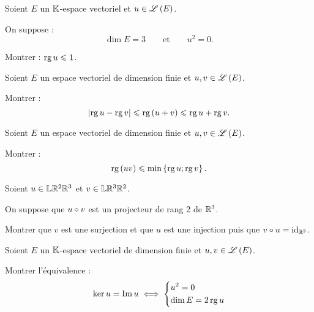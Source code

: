 \begin{corr}
\end{corr}

\begin{exo}
Soient \(E\) un \(\mathbb{K}\)-espace vectoriel et \(u\in\mathscr{L}\left(E\right)\).

On suppose : \[\dim E=3\qquad\text{et}\qquad u^2=0.\]

Montrer : \(\operatorname{rg} u\leqslant1\).
\end{exo}

\begin{corr}
\end{corr}

\begin{exo}
Soient \(E\) un espace vectoriel de dimension finie et \(u,v\in\mathscr{L}\left(E\right)\).

Montrer : \[\left\lvert\operatorname{rg} u-\operatorname{rg} v\right\rvert\leqslant\operatorname{rg}\left(u+v\right)\leqslant\operatorname{rg} u+\operatorname{rg} v.\]
\end{exo}

\begin{corr}
\end{corr}

\begin{exo}
Soient \(E\) un espace vectoriel de dimension finie et \(u,v\in\mathscr{L}\left(E\right)\).

Montrer : \[\operatorname{rg}\left(uv\right)\leqslant\min\left\lbrace\operatorname{rg} u;\operatorname{rg} v\right\rbrace.\]
\end{exo}

\begin{corr}
\end{corr}

\begin{exo}
Soient \(u\in\mathbb{L}{\mathbb{R}^2}{\mathbb{R}^3}\) et \(v\in\mathbb{L}{\mathbb{R}^3}{\mathbb{R}^2}\).

On suppose que \(u\circ v\) est un projecteur de rang 2 de \(\mathbb{R}^3\).

Montrer que \(v\) est une surjection et que \(u\) est une injection puis que \(v\circ u=\mathrm{id}_{\mathbb{R}^2}\).
\end{exo}

\begin{corr}
\end{corr}

\begin{exo}
Soient \(E\) un \(\mathbb{K}\)-espace vectoriel de dimension finie et \(u,v\in\mathscr{L}\left(E\right)\).

Montrer l'équivalence : \[\ker u=\operatorname{Im} u\iff\begin{dcases}
u^2=0 \\
\dim E=2\operatorname{rg} u
\end{dcases}\]
\end{exo}

